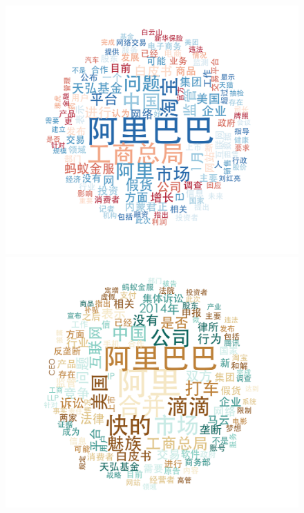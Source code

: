 \documentclass[11pt]{beamer}
\begin{document}
\begin{frame}
\begin{figure}
    \includegraphics[height=0.28\textheight]{plot/Jan-wordcloud}    \includegraphics[height=0.28\textheight]{plot/Feb-wordcloud}

\end{figure}
\end{frame}
\end{document}
